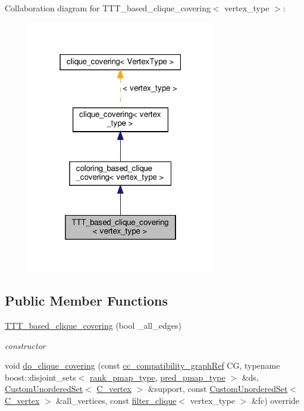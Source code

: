 Collaboration diagram for T\+T\+T\+\_\+based\+\_\+clique\+\_\+covering$<$ vertex\+\_\+type $>$\+:
\nopagebreak
\begin{figure}[H]
\begin{center}
\leavevmode
\includegraphics[width=232pt]{d9/dea/classTTT__based__clique__covering__coll__graph}
\end{center}
\end{figure}
\subsection*{Public Member Functions}
\begin{DoxyCompactItemize}
\item 
\hyperlink{classTTT__based__clique__covering_a2f1d71a79e381dfd9f66fddc8408d51d}{T\+T\+T\+\_\+based\+\_\+clique\+\_\+covering} (bool \+\_\+all\+\_\+edges)
\begin{DoxyCompactList}\small\item\em constructor \end{DoxyCompactList}\item 
void \hyperlink{classTTT__based__clique__covering_af040c67cc904c1a462b3a5efe81a1689}{do\+\_\+clique\+\_\+covering} (const \hyperlink{clique__covering__graph_8hpp_ac7a90ca8b64cfc536aaf17bc81186c18}{cc\+\_\+compatibility\+\_\+graph\+Ref} CG, typename boost\+::disjoint\+\_\+sets$<$ \hyperlink{clique__covering__graph_8hpp_af170aff46b9e4328f1ad9b119cf78b4a}{rank\+\_\+pmap\+\_\+type}, \hyperlink{clique__covering__graph_8hpp_af4c454ac367cfb12e29c98e6bc942a06}{pred\+\_\+pmap\+\_\+type} $>$ \&ds, \hyperlink{classCustomUnorderedSet}{Custom\+Unordered\+Set}$<$ \hyperlink{clique__covering__graph_8hpp_a9cb45047ea8c5ed95a8cfa90494345aa}{C\+\_\+vertex} $>$ \&support, const \hyperlink{classCustomUnorderedSet}{Custom\+Unordered\+Set}$<$ \hyperlink{clique__covering__graph_8hpp_a9cb45047ea8c5ed95a8cfa90494345aa}{C\+\_\+vertex} $>$ \&all\+\_\+vertices, const \hyperlink{structfilter__clique}{filter\+\_\+clique}$<$ vertex\+\_\+type $>$ \&fc) override
\end{DoxyCompactItemize}
